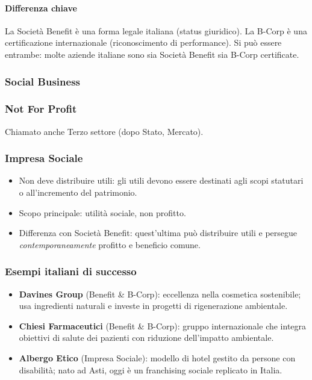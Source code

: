 \documentclass[a4paper,12pt]{article}
\begin{document}
	\paragraph{Differenza chiave}
	
	La Società Benefit è una forma legale italiana (status giuridico).%
	La B-Corp è una certificazione internazionale (riconoscimento di performance).%
	Si può essere entrambe: molte aziende italiane sono sia Società Benefit sia B-Corp certificate.
	
	\subsubsection{Social Business}
	
	\subsubsection{Not For Profit} 
	Chiamato anche Terzo settore (dopo Stato, Mercato).
	
	\subsubsection{Impresa Sociale}
	
	\begin{itemize}
		\item Non deve distribuire utili: gli utili devono essere destinati agli scopi statutari o all'incremento del patrimonio.
		\item Scopo principale: utilità sociale, non profitto.
		\item Differenza con Società Benefit: quest'ultima può distribuire utili e persegue \emph{contemporaneamente} profitto e beneficio comune.
	\end{itemize}
	
	\subsubsection{Esempi italiani di successo}
	
	\begin{itemize}
		\item \textbf{Davines Group} (Benefit \& B-Corp): eccellenza nella cosmetica sostenibile; usa ingredienti naturali e investe in progetti di rigenerazione ambientale.
		\item \textbf{Chiesi Farmaceutici} (Benefit \& B-Corp): gruppo internazionale che integra obiettivi di salute dei pazienti con riduzione dell'impatto ambientale.
		\item \textbf{Albergo Etico} (Impresa Sociale): modello di hotel gestito da persone con disabilità; nato ad Asti, oggi è un franchising sociale replicato in Italia.
	\end{itemize}
	
\end{document}
